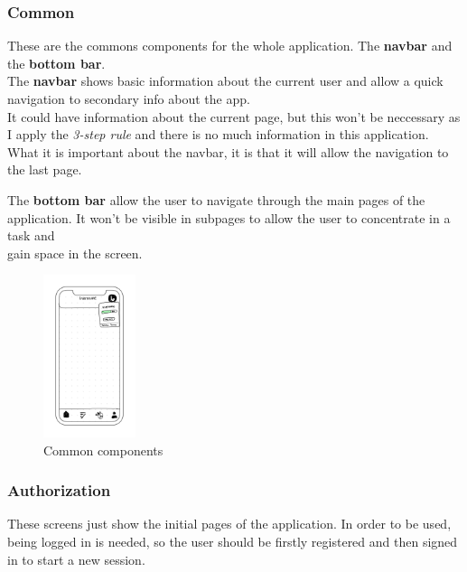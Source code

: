 \subsubsection{Common}
These are the commons components for the whole application. The \textbf{navbar} and the \textbf{bottom bar}. \\

The \textbf{navbar} shows basic information about the current user and allow a quick navigation to secondary info about the app. \\
It could have information about the current page, but this won't be neccessary as I apply the \textit{3-step rule} and there is no much information in this application. \\
What it is important about the navbar, it is that it will allow the navigation to the last page.

The \textbf{bottom bar} allow the user to navigate through the main pages of the application. It won't be visible in subpages to allow the user to concentrate in a task and \\
gain space in the screen. \\
\begin{figure}[H]
    \centering
    \includegraphics[width=0.24\textwidth]{assets/screens/Button - User.png}
    \caption{Common components}
    \label{fig:design_common}
\end{figure}

\subsubsection{Authorization}
These screens just show the initial pages of the application. In order to be used, being logged in is needed, so the user should be firstly registered and then signed in to start a new session.\\

